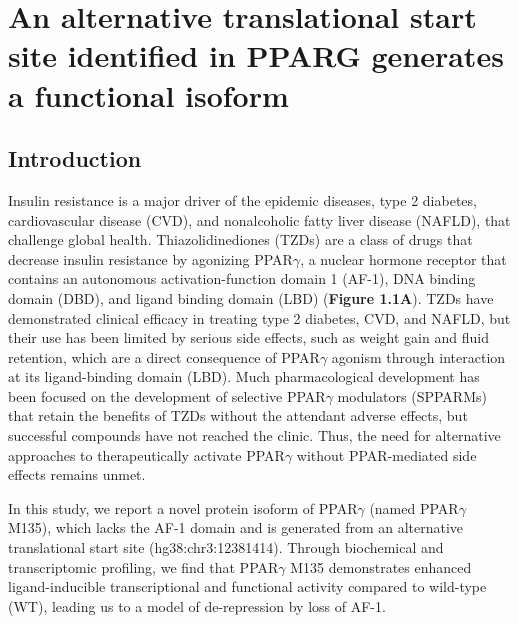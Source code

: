 \chapter{An alternative translational start site identified in PPARG generates a functional isoform
}\label{chap:chapter 1}

\section{Introduction}

Insulin resistance is a major driver of the epidemic diseases, type 2 diabetes, cardiovascular disease (CVD), and nonalcoholic fatty liver disease (NAFLD), that challenge global health\cite{James2021-vu,Adeva-Andany2019-df,Khan2019-qt}. Thiazolidinediones (TZDs) are a class of drugs that decrease insulin resistance by agonizing PPAR$\gamma$\cite{Yki-Jarvinen2004-ba}, a nuclear hormone receptor that contains an autonomous activation-function domain 1 (AF-1), DNA binding domain (DBD), and ligand binding domain (LBD) (\textbf{Figure 1.1A})\cite{Tontonoz1994-nk}. TZDs have demonstrated clinical efficacy in treating type 2 diabetes, CVD, and NAFLD\cite{Kernan2016-fd,Inzucchi2016-ni,Musso2017-xi}, but their use has been limited by serious side effects, such as weight gain and fluid retention, which are a direct consequence of PPAR$\gamma$ agonism through interaction at its ligand-binding domain (LBD)\cite{Yki-Jarvinen2004-ba}. Much pharmacological development has been focused on the development of selective PPAR$\gamma$ modulators (SPPARMs) that retain the benefits of TZDs without the attendant adverse effects, but successful compounds have not reached the clinic\cite{Higgins2010-tv,DePaoli2014-hi}. Thus, the need for alternative approaches to therapeutically activate PPAR$\gamma$ without PPAR-mediated side effects remains unmet.

In this study, we report a novel protein isoform of PPAR$\gamma$ (named PPAR$\gamma$ M135), which lacks the AF-1 domain and is generated from an alternative translational start site (hg38:chr3:12381414). Through biochemical and transcriptomic profiling, we find that PPAR$\gamma$ M135 demonstrates enhanced ligand-inducible transcriptional and functional activity compared to wild-type (WT), leading us to a model of de-repression by loss of AF-1.

